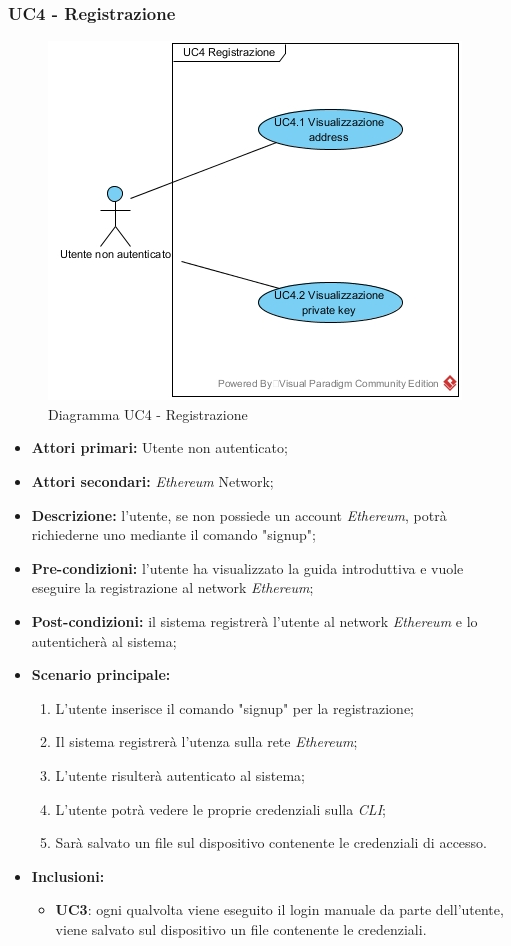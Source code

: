 \subsubsection{UC4 - Registrazione}
\begin{figure}[h]
	\centering
	\includegraphics[width=0.7\linewidth]{res/img/UC4.jpg}
	\caption{Diagramma UC4 - Registrazione}
\end{figure}
\begin{itemize}
	\item \textbf{Attori primari:} Utente non autenticato;
	\item \textbf{Attori secondari:} \textit{Ethereum\glo} Network;
	\item \textbf{Descrizione:} l'utente, se non possiede un account \textit{Ethereum\glos}, potrà richiederne uno mediante il comando "signup"; 
	\item \textbf{Pre-condizioni:} l'utente ha visualizzato la guida introduttiva e vuole eseguire la registrazione al network \textit{Ethereum\glos};
	\item \textbf{Post-condizioni:} il sistema registrerà l'utente al network \textit{Ethereum\glo} e lo autenticherà al sistema;
	\item \textbf{Scenario principale:} 
	\begin{enumerate}
		\item L'utente inserisce il comando "signup" per la registrazione;
		\item Il sistema registrerà l'utenza sulla rete \textit{Ethereum\glos};
		\item L'utente risulterà autenticato al sistema;
		\item L'utente potrà vedere le proprie credenziali sulla \textit{CLI\glos};
		\item Sarà salvato un file sul dispositivo contenente le credenziali di accesso.
	\end{enumerate}
	\item \textbf{Inclusioni:}
	\begin{itemize}
		\item\textbf{UC3}: ogni qualvolta viene eseguito il login manuale da parte dell'utente, viene salvato sul dispositivo un file contenente le credenziali.
	\end{itemize} 
\end{itemize}
